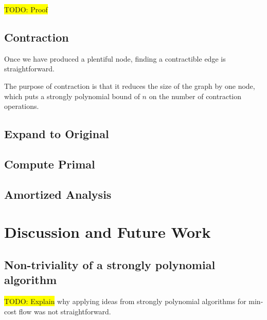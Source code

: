 \documentclass[11pt]{article}
\theoremstyle{definition}
\theoremstyle{definition}
\newcommand{\todo}[1]{\colorbox{yellow}{TODO: #1}}
\begin{document}
\todo{Proof}

\subsection{Contraction}

Once we have produced a plentiful node, finding a contractible edge is straightforward. 

The purpose of contraction is that it reduces the size of the graph by one node,
which puts a strongly polynomial bound of $n$ on the number of contraction
operations. 
\subsection{Expand to Original}
\subsection{Compute Primal}
\subsection{Amortized Analysis}





\section{Discussion and Future Work}

\subsection{Non-triviality of a strongly polynomial algorithm}

\todo{Explain} why applying ideas from strongly polynomial algorithms for
min-cost flow was not straightforward. 

\nocite{*}
\printbibliography
\end{document}
